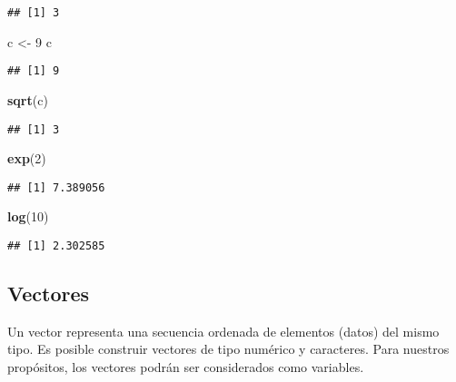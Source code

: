 \documentclass[]{book}
\newenvironment{Shaded}{\begin{snugshade}}{\end{snugshade}}
\newcommand{\DecValTok}[1]{\textcolor[rgb]{0.00,0.00,0.81}{#1}}
\newcommand{\KeywordTok}[1]{\textcolor[rgb]{0.13,0.29,0.53}{\textbf{#1}}}
\newcommand{\NormalTok}[1]{#1}
\newcommand{\StringTok}[1]{\textcolor[rgb]{0.31,0.60,0.02}{#1}}
\begin{document}
\begin{verbatim}
## [1] 3
\end{verbatim}

\begin{Shaded}
\begin{Highlighting}[]
\NormalTok{c <-}\StringTok{ }\DecValTok{9}
\NormalTok{c}
\end{Highlighting}
\end{Shaded}

\begin{verbatim}
## [1] 9
\end{verbatim}

\begin{Shaded}
\begin{Highlighting}[]
\KeywordTok{sqrt}\NormalTok{(c)}
\end{Highlighting}
\end{Shaded}

\begin{verbatim}
## [1] 3
\end{verbatim}

\begin{Shaded}
\begin{Highlighting}[]
\KeywordTok{exp}\NormalTok{(}\DecValTok{2}\NormalTok{)}
\end{Highlighting}
\end{Shaded}

\begin{verbatim}
## [1] 7.389056
\end{verbatim}

\begin{Shaded}
\begin{Highlighting}[]
\KeywordTok{log}\NormalTok{(}\DecValTok{10}\NormalTok{)}
\end{Highlighting}
\end{Shaded}

\begin{verbatim}
## [1] 2.302585
\end{verbatim}

\hypertarget{vectores}{%
\subsection{Vectores}\label{vectores}}

Un vector representa una secuencia ordenada de elementos (datos) del mismo tipo. Es posible construir vectores de tipo numérico y caracteres. Para nuestros propósitos, los vectores podrán ser considerados como variables.
\end{document}
